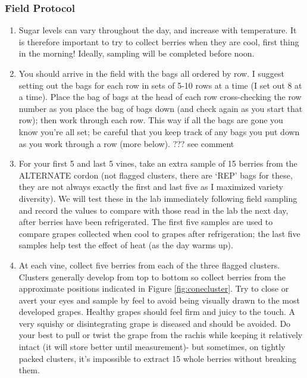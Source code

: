 \documentclass[11pt,letter]{article}
\begin{document}
\subsubsection{Field Protocol}
\begin{enumerate}
\item Sugar levels can vary throughout the day, and increase with temperature. It is therefore important to try to collect berries when they are cool, first thing in the morning! Ideally, sampling will be completed before noon. 

\item You should arrive in the field with the bags all ordered by row.  I suggest setting out the bags for each row in sets of 5-10 rows at a time (I set out 8 at a time). Place the bag of bags at the head of each row cross-checking the row number as you place the bag of bags down (and check again as you start that row); then work through each row. This way if all the bags are gone you know you're all set; be careful that you keep track of any bags you put down as you work through a row (more below). ??? see comment %

\item For your first 5 and last 5 vines, take an extra sample of 15 berries from the ALTERNATE cordon (not flagged clusters, there are ‘REP’ bags for these, they are not always exactly the first and last five as I maximized variety diversity). We will test these in the lab immediately following field sampling and record the values to compare with those read in the lab the next day, after berries have been refrigerated. The first five samples are used to compare grapes collected when cool to grapes after refrigeration; the last five samples help test the effect of heat (as the day warms up). %

\item At each vine, collect five berries from each of the three flagged clusters. Clusters generally develop from top to bottom so collect berries from the approximate positions indicated in Figure \ref{fig:conecluster}. Try to close or avert your eyes and sample by feel to avoid being visually drawn to the most developed grapes. Healthy grapes should feel firm and juicy to the touch. A very squishy or disintegrating grape is diseased and should be avoided. Do your best to pull or twist the grape from the rachis while keeping it relatively intact (it will store better until measurement)- but sometimes, on tightly packed clusters, it’s impossible to extract 15 whole berries without breaking them. 


\end{enumerate}
\end{document}
